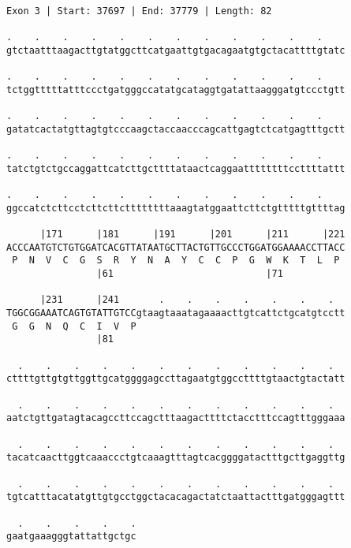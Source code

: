 \documentclass{article}
\begin{document}
\newpage
\begin{Verbatim}
Exon 3 | Start: 37697 | End: 37779 | Length: 82
 
.    .    .    .    .    .    .    .    .    .    .    .    
gtctaatttaagacttgtatggcttcatgaattgtgacagaatgtgctacattttgtatc
  
.    .    .    .    .    .    .    .    .    .    .    .    
tctggtttttatttccctgatgggccatatgcataggtgatattaagggatgtccctgtt
  
.    .    .    .    .    .    .    .    .    .    .    .    
gatatcactatgttagtgtcccaagctaccaacccagcattgagtctcatgagtttgctt
  
.    .    .    .    .    .    .    .    .    .    .    .    
tatctgtctgccaggattcatcttgcttttataactcaggaattttttttccttttattt
  
.    .    .    .    .    .    .    .    .    .    .    .    
ggccatctcttcctcttcttcttttttttaaagtatggaattcttctgtttttgttttag
  
      |171      |181      |191      |201      |211      |221
ACCCAATGTCTGTGGATCACGTTATAATGCTTACTGTTGCCCTGGATGGAAAACCTTACC
 P  N  V  C  G  S  R  Y  N  A  Y  C  C  P  G  W  K  T  L  P 
                |61                           |71           
  
      |231      |241       .    .    .    .    .    .    .  
TGGCGGAAATCAGTGTATTGTCCgtaagtaaatagaaaacttgtcattctgcatgtcctt
 G  G  N  Q  C  I  V  P                                     
                |81                                         
  
  .    .    .    .    .    .    .    .    .    .    .    .  
cttttgttgtgttggttgcatggggagccttagaatgtggccttttgtaactgtactatt
  
  .    .    .    .    .    .    .    .    .    .    .    .  
aatctgttgatagtacagccttccagctttaagacttttctacctttccagtttgggaaa
  
  .    .    .    .    .    .    .    .    .    .    .    .  
tacatcaacttggtcaaaccctgtcaaagtttagtcacggggatactttgcttgaggttg
  
  .    .    .    .    .    .    .    .    .    .    .    .  
tgtcatttacatatgttgtgcctggctacacagactatctaattactttgatgggagttt
  
  .    .    .    .    .
gaatgaaagggtattattgctgc
\end{Verbatim}
\newpage
\end{document}

